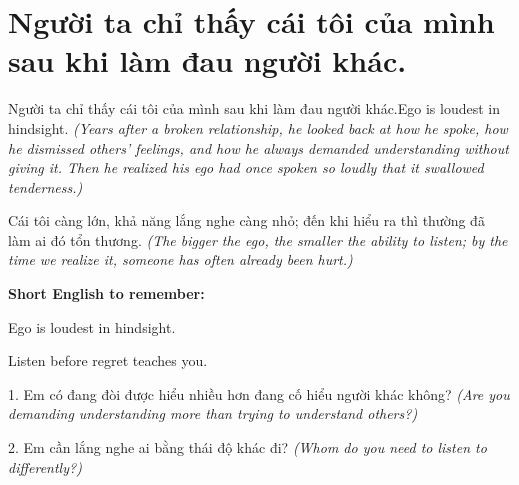 \section{Người ta chỉ thấy cái tôi của mình sau khi làm đau người khác.}
\begin{truyen}{Người ta chỉ thấy cái tôi của mình sau khi làm đau người khác.}{Ego is loudest in hindsight.}
\textit{(Years after a broken relationship, he looked back at how he spoke, how he dismissed others' feelings, and how he always demanded understanding without giving it. Then he realized his ego had once spoken so loudly that it swallowed tenderness.)}
\end{truyen}
\begin{baihoc}
Cái tôi càng lớn, khả năng lắng nghe càng nhỏ; đến khi hiểu ra thì thường đã làm ai đó tổn thương.
\textit{(The bigger the ego, the smaller the ability to listen; by the time we realize it, someone has often already been hurt.)}
\end{baihoc}
\begin{ghinhoanh}
\textbf{Short English to remember:}

Ego is loudest in hindsight.

Listen before regret teaches you.
\end{ghinhoanh}
\begin{tuhocnhanh}
1. Em có đang đòi được hiểu nhiều hơn đang cố hiểu người khác không? \textit{(Are you demanding understanding more than trying to understand others?)}

2. Em cần lắng nghe ai bằng thái độ khác đi? \textit{(Whom do you need to listen to differently?)}
\end{tuhocnhanh}
\ngancach